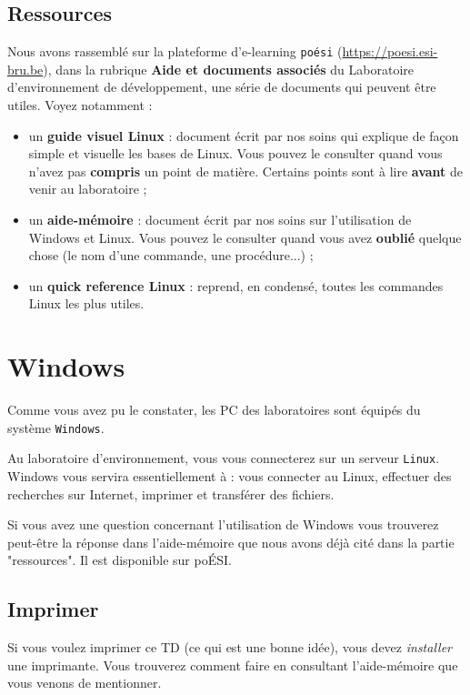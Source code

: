 \documentclass[a4paper,11pt]{article}
\begin{document}
\subsection{Ressources}
Nous avons rassemblé sur la plateforme d'e-learning \verb_poési_ (\url{https://poesi.esi-bru.be}), dans la rubrique \textbf{Aide et documents associés} du Laboratoire d'environnement de développement, une série de documents qui peuvent être utiles. Voyez notamment :
\par
\begin{itemize}
\item un \textbf{guide visuel Linux} : document écrit par nos soins qui explique de façon simple et visuelle les bases de Linux. Vous pouvez le consulter quand vous n'avez pas \textbf{compris} un point de matière. Certains points sont à lire \textbf{avant} de venir au laboratoire ;
\item un \textbf{aide-mémoire} : document écrit par nos soins sur l'utilisation de Windows et Linux. Vous pouvez le consulter quand vous avez \textbf{oublié} quelque chose (le nom d'une commande, une procédure...) ;
\item	un \textbf{quick reference Linux} : reprend, en condensé, toutes les commandes Linux les plus utiles. 
\end{itemize}


\section{Windows}

Comme vous avez pu le constater, les PC des laboratoires sont équipés du système \verb_Windows_.
\par			
Au laboratoire d'environnement, vous vous connecterez sur un serveur \verb_Linux_. Windows vous servira essentiellement à : vous connecter au Linux, 
effectuer des recherches sur Internet, imprimer et transférer des fichiers.
\par
Si vous avez une question concernant l'utilisation de Windows vous trouverez peut-être la réponse dans l'aide-mémoire que nous avons déjà cité dans la partie "ressources". Il est disponible sur poÉSI. 
\par		

\subsection{Imprimer}
Si vous voulez imprimer ce TD (ce qui est une bonne idée), vous devez \textit{installer} une imprimante. Vous trouverez comment faire en consultant l'aide-mémoire que vous venons de mentionner.
\par
\end{document}

